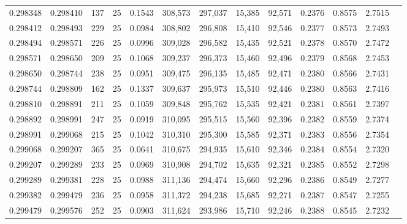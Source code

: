 \begin{tabular}{rrrrrrrrrrrrr}
0.298348 & 0.298410 &   137 &  25 &                                     0.1543 & 308,573 & 297,037 &  15,385 &  92,571 & 0.2376 & 0.8575 & 2.7515 \\
0.298412 & 0.298493 &   229 &  25 &                                     0.0984 & 308,802 & 296,808 &  15,410 &  92,546 & 0.2377 & 0.8573 & 2.7493 \\
0.298494 & 0.298571 &   226 &  25 &                                     0.0996 & 309,028 & 296,582 &  15,435 &  92,521 & 0.2378 & 0.8570 & 2.7472 \\
0.298571 & 0.298650 &   209 &  25 &                                     0.1068 & 309,237 & 296,373 &  15,460 &  92,496 & 0.2379 & 0.8568 & 2.7453 \\
0.298650 & 0.298744 &   238 &  25 &                                     0.0951 & 309,475 & 296,135 &  15,485 &  92,471 & 0.2380 & 0.8566 & 2.7431 \\
0.298744 & 0.298809 &   162 &  25 &                                     0.1337 & 309,637 & 295,973 &  15,510 &  92,446 & 0.2380 & 0.8563 & 2.7416 \\
0.298810 & 0.298891 &   211 &  25 &                                     0.1059 & 309,848 & 295,762 &  15,535 &  92,421 & 0.2381 & 0.8561 & 2.7397 \\
0.298892 & 0.298991 &   247 &  25 &                                     0.0919 & 310,095 & 295,515 &  15,560 &  92,396 & 0.2382 & 0.8559 & 2.7374 \\
0.298991 & 0.299068 &   215 &  25 &                                     0.1042 & 310,310 & 295,300 &  15,585 &  92,371 & 0.2383 & 0.8556 & 2.7354 \\
0.299068 & 0.299207 &   365 &  25 &                                     0.0641 & 310,675 & 294,935 &  15,610 &  92,346 & 0.2384 & 0.8554 & 2.7320 \\
0.299207 & 0.299289 &   233 &  25 &                                     0.0969 & 310,908 & 294,702 &  15,635 &  92,321 & 0.2385 & 0.8552 & 2.7298 \\
0.299289 & 0.299381 &   228 &  25 &                                     0.0988 & 311,136 & 294,474 &  15,660 &  92,296 & 0.2386 & 0.8549 & 2.7277 \\
0.299382 & 0.299479 &   236 &  25 &                                     0.0958 & 311,372 & 294,238 &  15,685 &  92,271 & 0.2387 & 0.8547 & 2.7255 \\
0.299479 & 0.299576 &   252 &  25 &                                     0.0903 & 311,624 & 293,986 &  15,710 &  92,246 & 0.2388 & 0.8545 & 2.7232 \\

\end{tabular}
